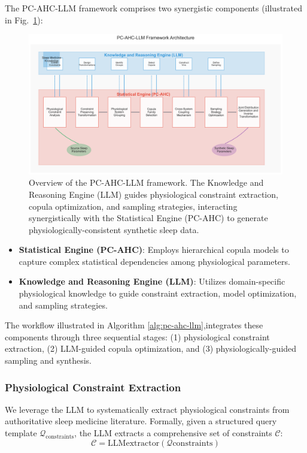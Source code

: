 \documentclass[preprint,12pt]{elsarticle}
\begin{document}
The PC-AHC-LLM framework comprises two synergistic components (illustrated in Fig.~\ref{PC-AHC-LLM}):
\begin{figure}[t]
\centering
\includegraphics[width=\textwidth]{pc_ahc_llm_framework_final.png}
\caption{Overview of the PC-AHC-LLM framework. The Knowledge and Reasoning Engine (LLM) guides physiological constraint extraction, copula optimization, and sampling strategies, interacting synergistically with the Statistical Engine (PC-AHC) to generate physiologically-consistent synthetic sleep data.}
\label{PC-AHC-LLM}
\end{figure}
\begin{itemize}
\item \textbf{Statistical Engine (PC-AHC)}: Employs hierarchical copula models to capture complex statistical dependencies among physiological parameters.
\item \textbf{Knowledge and Reasoning Engine (LLM)}: Utilizes domain-specific physiological knowledge to guide constraint extraction, model optimization, and sampling strategies.
\end{itemize}

The workflow illustrated in Algorithm \ref{alg:pc-ahc-llm},integrates these components through three sequential stages: (1) physiological constraint extraction, (2) LLM-guided copula optimization, and (3) physiologically-guided sampling and synthesis.

\subsubsection{Physiological Constraint Extraction}

We leverage the LLM to systematically extract physiological constraints from authoritative sleep medicine literature. Formally, given a structured query template $\mathcal{Q}_{\text{constraints}}$, the LLM extracts a comprehensive set of constraints $\mathcal{C}$:
\begin{equation}
\mathcal{C} = \text{LLM}{\text{extractor}}( \mathcal{Q}{\text{constraints}})
\end{equation}
\end{document}
